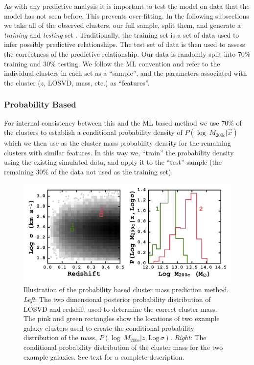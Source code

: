 \documentclass[fleqn,usenatbib]{mnras}
\begin{document}
As with any predictive analysis it is important to test the model on data that the model has not seen before. This prevents over-fitting. In the following subsections we take all of the observed clusters, our full sample, split them, and generate a \emph{training} and \emph{testing} set . Traditionally, the training set is a set of data used to infer possibly predictive relationships. The test set of data is then used to assess the correctness of the predictive relationship. Our data is randomly split into 70\% training and 30\% testing. We follow the ML convention and refer to the individual clusters in each set as a ``sample'', and the parameters associated with the cluster ($z$, LOSVD, mass, etc.) as ``features''.

\subsubsection{Probability Based}\label{sec:probability method}
For internal consistency between this and the ML based method we use 70\% of the clusters to establish a conditional probability density of $P(\log\ M_{200c} | \vec{x})$ which we then use as the cluster mass probability density for the remaining clusters with similar features. In this way we, ``train'' the probability density using the existing simulated data, and apply it to the ``test'' sample (the remaining 30\% of the data not used as the training set).

\begin{figure}
	\includegraphics[width=\textwidth]{figures/prob_example.pdf} 
	\caption[Illustration of the probability based cluster mass prediction method.]{Illustration of the probability based cluster mass prediction method. \emph{Left}: The two dimensional posterior probability distribution of LOSVD and redshift used to determine the correct cluster mass. The pink and green rectangles show the locations of two example galaxy clusters used to create the conditional probability distribution of the mass, $P(\log\ M_{200c}|z, \mathrm{Log}\, \sigma)$. \emph{Right}: The conditional probability distribution of the cluster mass for the two example galaxies. See text for a complete description.}
	\label{fig: probability corner} 
\end{figure}
\end{document}
